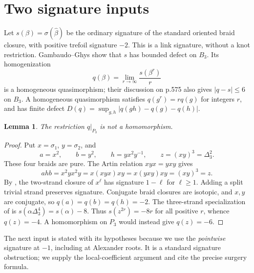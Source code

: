 \documentclass[11pt]{article}
\newtheorem{lemma}[theorem]{Lemma}
\begin{document}
\section{Two signature inputs}
Let $s(\beta)=\sigma(\widehat\beta)$ be the ordinary signature of the
standard oriented braid closure, with positive trefoil signature $-2$.
This is a link signature, without a knot restriction.
Gambaudo--Ghys \cite[Theorem A and Remark 1]{GG} show that $s$ has bounded
defect on $B_3$. Its homogenization
\[
 q(\beta)=\lim_{r\to\infty}\frac{s(\beta^r)}r
\]
is a homogeneous quasimorphism; their discussion on p.575 also gives
$|q-s|\leq6$ on $B_3$. A homogeneous quasimorphism satisfies
$q(g^r)=rq(g)$ for integers $r$, and has finite defect
$D(q)=\sup_{g,h}|q(gh)-q(g)-q(h)|$.

\begin{lemma}\label{lem:pure}
The restriction $q|_{P_3}$ is not a homomorphism.
\end{lemma}
\begin{proof}
Put $x=\sigma_1$, $y=\sigma_2$, and
\[
 a=x^2,\qquad b=y^2,\qquad h=yx^2y^{-1},\qquad
 z=(xy)^3=\Delta_3^2.
\]
These four braids are pure. The Artin relation $xyx=yxy$ gives
\[
 ahb=x^2yx^2y=x(xyx)xy=x(yxy)xy=(xy)^3=z.
\]
By \cite[Remark 3, p.545]{GG}, the two-strand closure of $x^\ell$
has signature $1-\ell$ for $\ell\geq1$. Adding a split trivial strand
preserves signature. Conjugate braid closures are isotopic, and $x,y$
are conjugate, so
$q(a)=q(b)=q(h)=-2$.
The three-strand specialization of \cite[Lemma 4.1, pp.568--569]{GG}
is $s(\alpha\Delta_3^4)=s(\alpha)-8$.
Thus $s(z^{2r})=-8r$ for all positive $r$, whence $q(z)=-4$.
A homomorphism on $P_3$ would instead give $q(z)=-6$.
\end{proof}

The next input is stated with its hypotheses because we use the
\emph{pointwise} signature at $-1$, including at Alexander roots.
It is a standard signature obstruction; we supply the local-coefficient
argument and cite the precise surgery formula.
\end{document}
